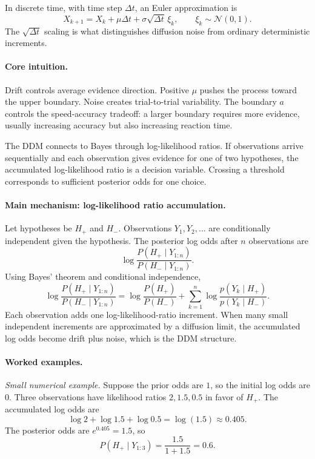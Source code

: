 In discrete time, with time step \(\Delta t\), an Euler approximation is
\[
X_{k+1}=X_k+\mu\Delta t+\sigma\sqrt{\Delta t}\,\xi_k,
\qquad
\xi_k\sim\mathcal N(0,1).
\]
The \(\sqrt{\Delta t}\) scaling is what distinguishes diffusion noise from ordinary deterministic increments.

\paragraph{Core intuition.}
Drift controls average evidence direction. Positive \(\mu\) pushes the process toward the upper boundary. Noise creates trial-to-trial variability. The boundary \(a\) controls the speed-accuracy tradeoff: a larger boundary requires more evidence, usually increasing accuracy but also increasing reaction time.

The DDM connects to Bayes through log-likelihood ratios. If observations arrive sequentially and each observation gives evidence for one of two hypotheses, the accumulated log-likelihood ratio is a decision variable. Crossing a threshold corresponds to sufficient posterior odds for one choice.

\paragraph{Main mechanism: log-likelihood ratio accumulation.}
Let hypotheses be \(H_+\) and \(H_-\). Observations \(Y_1,Y_2,\ldots\) are conditionally independent given the hypothesis. The posterior log odds after \(n\) observations are
\[
\log\frac{P(H_+\mid Y_{1:n})}{P(H_-\mid Y_{1:n})}.
\]
Using Bayes' theorem and conditional independence,
\[
\log\frac{P(H_+\mid Y_{1:n})}{P(H_-\mid Y_{1:n})}
=
\log\frac{P(H_+)}{P(H_-)}
+
\sum_{k=1}^n
\log\frac{p(Y_k\mid H_+)}{p(Y_k\mid H_-)}.
\]
Each observation adds one log-likelihood-ratio increment. When many small independent increments are approximated by a diffusion limit, the accumulated log odds become drift plus noise, which is the DDM structure.

\paragraph{Worked examples.}
\emph{Small numerical example.}
Suppose the prior odds are \(1\), so the initial log odds are \(0\). Three observations have likelihood ratios \(2,1.5,0.5\) in favor of \(H_+\). The accumulated log odds are
\[
\log 2+\log 1.5+\log 0.5
=\log(1.5)\approx0.405.
\]
The posterior odds are \(e^{0.405}=1.5\), so
\[
P(H_+\mid Y_{1:3})=\frac{1.5}{1+1.5}=0.6.
\]


